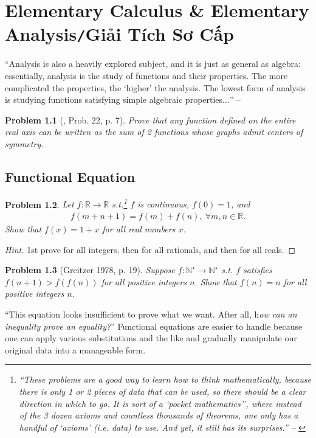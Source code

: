 \documentclass[oneside]{book}
\numberwithin{equation}{section}
\newtheorem{problem}{Problem}[section]
\begin{document}

\chapter{Elementary Calculus \& Elementary Analysis\texttt{/}Giải Tích Sơ Cấp}
``Analysis is also a heavily explored subject, and it is just as general as algebra: essentially, analysis is the study of functions and their properties. The more complicated the properties, the `higher' the analysis. The lowest form of analysis is studying functions satisfying simple algebraic properties$\ldots$'' -- \cite[Chap. 3, p. 36]{Tao2006}

\begin{problem}[\cite{Gelca_Andreescu2017}, Prob. 22, p. 7]
	Prove that any function defined on the entire real axis can be written as the sum of 2 functions whose graphs admit centers of symmetry.
\end{problem}

\section{Functional Equation}
\begin{problem}
	Let $f:\mathbb{R}\to\mathbb{R}$ s.t.\footnote{``These problems are a good way to learn how to think mathematically, because there is only 1 or 2 pieces of data that can be used, so there should be a clear direction in which to go. It is sort of a `pocket mathematics'’, where instead of the 3 dozen axioms and countless thousands of theorems, one only has a handful of `axioms' (i.e. data) to use. And yet, it still has its surprises.'' -- \cite[Chap. 3, p. 36]{Tao2006}} $f$ is continuous, $f(0) = 1$, and
	\begin{align*}
		f(m + n + 1) = f(m) + f(n),\ \forall m,n\in\mathbb{R}.
	\end{align*}
	Show that $f(x) = 1 + x$ for all real numbers $x$.
\end{problem}

\begin{proof}[Hint]
	1st prove for all integers, then for all rationals, and then for all reals.
\end{proof}

\begin{problem}[Greitzer 1978, p. 19]
	Suppose $f:\mathbb{N}^\star\to\mathbb{N}^\star$ s.t. $f$ satisfies $f(n + 1) > f(f(n))$ for all positive integers $n$. Show that $f(n) = n$ for all positive integers $n$.
\end{problem}
``This equation looks insufficient to prove what we want. After all, h\textit{ow can an inequality prove an equality?}'' Functional equations are easier to handle because one can apply various substitutions and the like and gradually manipulate our original data into a manageable form.
\end{document}
